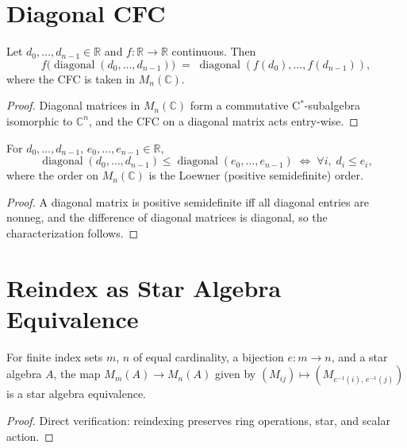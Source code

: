 \section{Diagonal CFC}

\begin{theorem}
  \label{thm:cfc_diagonal}
  \leanok
  Let $d_0,\ldots,d_{n-1} \in \mathbb{R}$ and $f : \mathbb{R} \to \mathbb{R}$
  continuous.  Then
  \[
    f\!\bigl(\operatorname{diagonal}(d_0,\ldots,d_{n-1})\bigr)
    \;=\;
    \operatorname{diagonal}(f(d_0),\ldots,f(d_{n-1})),
  \]
  where the CFC is taken in $M_n(\mathbb{C})$.
  \begin{proof}
    \leanok
    Diagonal matrices in $M_n(\mathbb{C})$ form a commutative C$^*$-subalgebra
    isomorphic to $\mathbb{C}^n$, and the CFC on a diagonal matrix acts entry-wise.
  \end{proof}
\end{theorem}

\begin{theorem}
  \label{thm:diagonal_le_diagonal}
  \leanok
  For $d_0,\ldots,d_{n-1},\, e_0,\ldots,e_{n-1} \in \mathbb{R}$,
  \[
    \operatorname{diagonal}(d_0,\ldots,d_{n-1}) \leq \operatorname{diagonal}(e_0,\ldots,e_{n-1})
    \;\iff\;
    \forall i,\; d_i \leq e_i,
  \]
  where the order on $M_n(\mathbb{C})$ is the Loewner (positive semidefinite) order.
  \begin{proof}
    \leanok
    A diagonal matrix is positive semidefinite iff all diagonal entries are nonneg,
    and the difference of diagonal matrices is diagonal, so the characterization follows.
  \end{proof}
\end{theorem}

\section{Reindex as Star Algebra Equivalence}

\begin{proposition}
  \label{prop:reindex_star_alg}
  \leanok
  For finite index sets $m$, $n$ of equal cardinality, a bijection $e : m \to n$,
  and a star algebra $A$, the map $M_m(A) \to M_n(A)$ given by
  $(M_{ij}) \mapsto (M_{e^{-1}(i),\,e^{-1}(j)})$ is a star algebra equivalence.
  \begin{proof}
    \leanok
    Direct verification: reindexing preserves ring operations, star, and scalar action.
  \end{proof}
\end{proposition}
